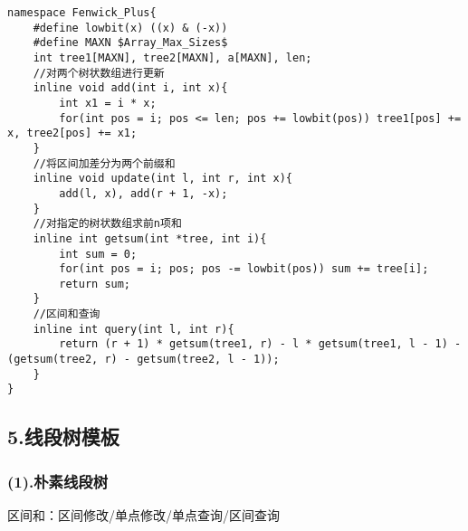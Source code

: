 \documentclass[]{article}
\begin{document}
\begin{verbatim}
namespace Fenwick_Plus{
    #define lowbit(x) ((x) & (-x))
    #define MAXN $Array_Max_Sizes$
    int tree1[MAXN], tree2[MAXN], a[MAXN], len;
    //对两个树状数组进行更新
    inline void add(int i, int x){
        int x1 = i * x;
        for(int pos = i; pos <= len; pos += lowbit(pos)) tree1[pos] += x, tree2[pos] += x1;
    }
    //将区间加差分为两个前缀和
    inline void update(int l, int r, int x){
        add(l, x), add(r + 1, -x);
    }
    //对指定的树状数组求前n项和
    inline int getsum(int *tree, int i){
        int sum = 0;
        for(int pos = i; pos; pos -= lowbit(pos)) sum += tree[i];
        return sum;
    }
    //区间和查询
    inline int query(int l, int r){
        return (r + 1) * getsum(tree1, r) - l * getsum(tree1, l - 1) - (getsum(tree2, r) - getsum(tree2, l - 1));
    }
}
\end{verbatim}

\hypertarget{ux7ebfux6bb5ux6811ux6a21ux677f}{%
\subsection{5.线段树模板}\label{ux7ebfux6bb5ux6811ux6a21ux677f}}

\hypertarget{ux6734ux7d20ux7ebfux6bb5ux6811}{%
\subsubsection{(1).朴素线段树}\label{ux6734ux7d20ux7ebfux6bb5ux6811}}

区间和：区间修改/单点修改/单点查询/区间查询
\end{document}
